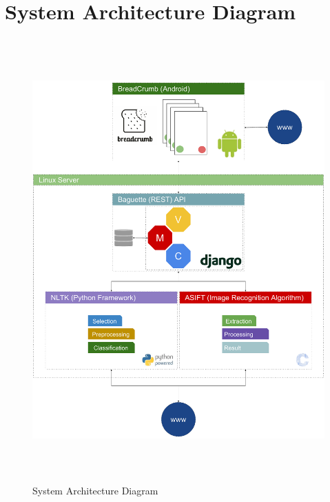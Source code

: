 \clearpage

\section{System Architecture Diagram}

\vfill

\begin{figure}
  \centering
  \begin{minipage}{140mm}
    \centering
    \includegraphics[height=170mm]{inc/SystemArchitecture.pdf}
    \caption{System Architecture Diagram}
    \label{fig:architecture_diagram}
  \end{minipage}
\end{figure}

\vfill

